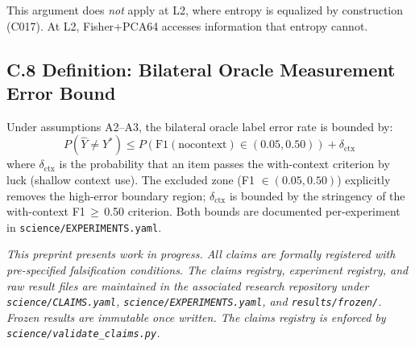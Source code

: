 \documentclass[11pt]{article}
\newcommand{\code}[1]{\texttt{\small #1}}
\begin{document}
This argument does \emph{not} apply at L2, where entropy is equalized by construction
(C017). At L2, Fisher+PCA64 accesses information that entropy cannot.

\subsection*{C.8 Definition: Bilateral Oracle Measurement Error Bound}

Under assumptions A2--A3, the bilateral oracle label error rate is bounded by:
\[
P(\hat{Y} \neq Y^*) \leq P(\text{F1}(\text{nocontext}) \in (0.05, 0.50)) + \delta_\text{ctx}
\]
where $\delta_\text{ctx}$ is the probability that an item passes the with-context criterion
by luck (shallow context use). The excluded zone (F1 $\in (0.05, 0.50)$) explicitly
removes the high-error boundary region; $\delta_\text{ctx}$ is bounded by the stringency
of the with-context F1\,$\geq$\,0.50 criterion. Both bounds are
documented per-experiment in \code{science/EXPERIMENTS.yaml}.

\bigskip
\noindent
\textit{This preprint presents work in progress. All claims are formally registered
with pre-specified falsification conditions. The claims registry, experiment registry,
and raw result files are maintained in the associated research repository under
\code{science/CLAIMS.yaml}, \code{science/EXPERIMENTS.yaml}, and
\code{results/frozen/}. Frozen results are immutable once written. The claims registry
is enforced by \code{science/validate\_claims.py}.}
\end{document}
